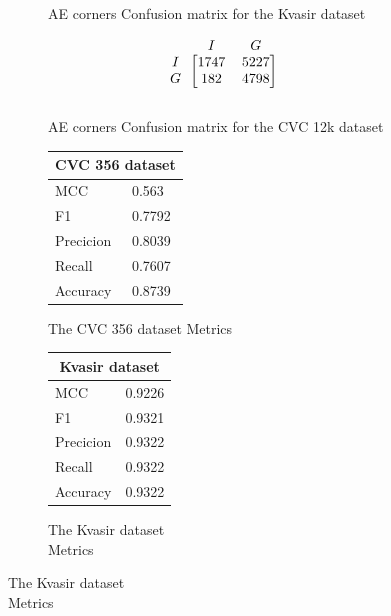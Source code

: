 \begin{figure}
\begin{subfigure}[b]{0.49\textwidth}
        
\caption{AE corners Confusion matrix for the Kvasir dataset}
\label{mat:kvasir_CM_DN121_AE_CORNER}
\end{subfigure}
\begin{subfigure}[b]{0.25\textwidth}
        \[
\begin{blockarray}{ccc}
& I & G  \\
\begin{block}{c[cc]}
 		I&1747 & 5227\\
        G&182  & 4798\\
\end{block}
\end{blockarray}
\]   
\caption{AE corners Confusion matrix for the CVC 12k dataset}
\label{mat:cvc12k_CM_DN121_AE_CORNER}
\end{subfigure}
\caption{Confusion matrices for the three datasets}
\label{mat:CM_DN121_AE_CORNER}
\begin{subfigure}[b]{0.25\textwidth}
\begin{tabular}{ll}      
        \toprule
        \multicolumn{2}{c}{CVC 356 dataset}        \\
        \midrule
        MCC 		& 0.563 \\
        F1  		& 0.7792 \\
        Precicion  	& 0.8039 \\
        Recall     	& 0.7607 \\
        Accuracy	& 0.8739 \\
        \bottomrule
        \end{tabular}
\caption{The CVC 356 dataset Metrics}
\label{tab:cvc356_metrics_DN121_AE_CORNER}
\end{subfigure}%
\begin{subfigure}[b]{0.49\textwidth}
    	\centering
        \begin{tabular}{ll}
        \toprule
        \multicolumn{2}{c}{Kvasir dataset}        \\
        \midrule
        MCC 		& 0.9226 \\
        F1  		& 0.9321 \\
        Precicion  	& 0.9322 \\
        Recall     	& 0.9322 \\
        Accuracy	& 0.9322 \\
        \bottomrule
\end{tabular}
\caption{The Kvasir dataset\\ Metrics}
\label{tab:kvasir_metrics_DN121_AE_CORNER}
\end{subfigure}%

\end{figure}
